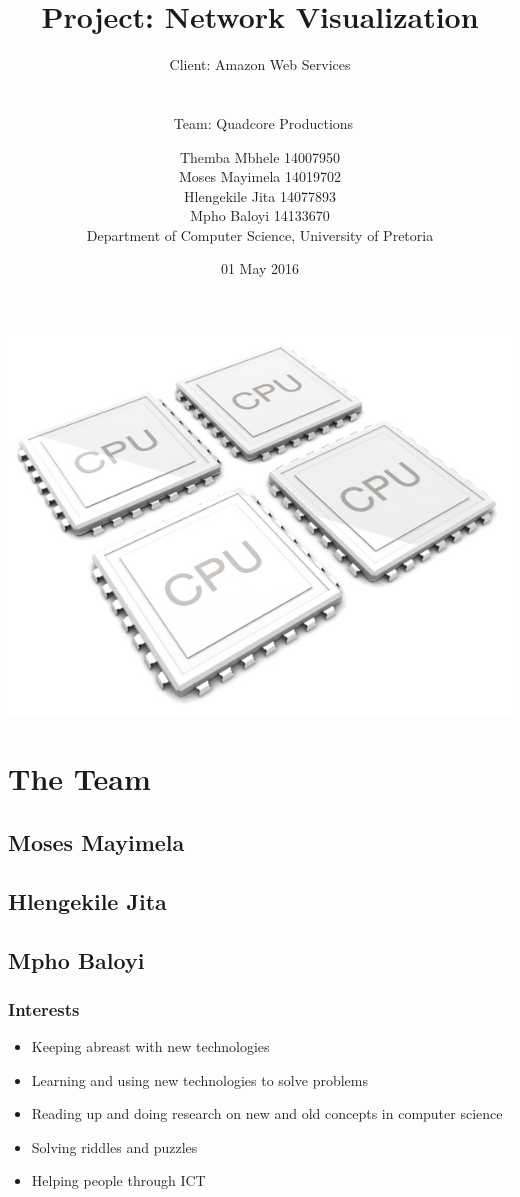 \documentclass{scrartcl}
\title{Project: Network Visualization}
\subtitle{Client: Amazon Web Services \\\\\\\ Team: Quadcore Productions\\}
\author{Themba Mbhele 14007950\\ Moses Mayimela 14019702 \\ Hlengekile Jita 14077893 \\ Mpho Baloyi 14133670 \\Department of Computer Science, University of Pretoria}
\date{01 May 2016}
\begin{document}
\maketitle
\includegraphics[width=\textwidth]{2012-quad-core-phones}
\section{The Team}
\subsection{Moses Mayimela}
\subsection{Hlengekile Jita}
\subsection{Mpho Baloyi}
\subsubsection{Interests}
\begin{itemize}
\item Keeping abreast with new technologies
\item Learning and using new technologies to solve problems
\item Reading up and doing research on new and old concepts in computer science
\item Solving riddles and puzzles
\item Helping people through ICT
\end{itemize}
\end{document}
